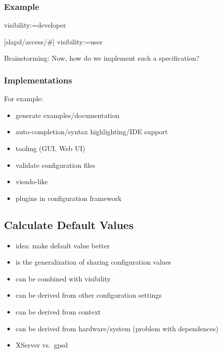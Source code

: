 \begin{frame}[fragile]
	\frametitle{Example}
	\begin{code}
	visibility:=developer

	[slapd/access/#]
	visibility:=user
	\end{code}
\end{frame}


\begin{assignment}
	\begin{task}
	Brainstorming: Now, how do we implement such a specification?
	\end{task}
\end{assignment}

\begin{frame}
	\frametitle{Implementations}
	For example:
	\begin{itemize}
	\item generate examples/documentation
	\item auto-completion/syntax highlighting/IDE support
	\item tooling (GUI, Web UI)
	\item validate configuration files
	\item visudo-like
	\item plugins in configuration framework
	\end{itemize}
\end{frame}

\subsection{Calculate Default Values}

\begin{frame}
	\begin{itemize}
	\item idea: make default value better
	\item is the generalization of sharing configuration values
	\item can be combined with visibility
	\pause
	\item can be derived from other configuration settings
	\item can be derived from context~\cite{raab2017introducing}
	\item can be derived from hardware/system (problem with dependences)
	\pause
	\item XServer vs.\ gpsd
	\end{itemize}
\end{frame}

